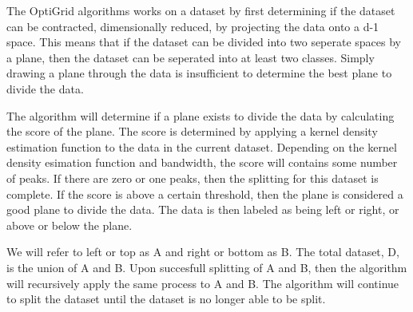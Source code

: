 The OptiGrid algorithms works on a dataset by first determining if the dataset can be contracted, dimensionally reduced, by projecting the data onto a d-1 space. 
This means that if the dataset can be divided into two seperate spaces by a plane, then the dataset can be seperated into at least two classes. Simply drawing a plane through the data is insufficient to determine the best plane to divide the data.\par

The algorithm will determine if a plane exists to divide the data by calculating the score of the plane. 
The score is determined by applying a kernel density estimation function to the data in the current dataset.
Depending on the kernel density esimation function and bandwidth, the score will contains some number of peaks.
If there are zero or one peaks, then the splitting for this dataset is complete. If the score is above a certain threshold, then the plane is considered a good plane to divide the data.
The data is then labeled as being left or right, or above or below the plane.\par
We will refer to left or top as A and right or bottom as B. 
The total dataset, D, is the union of A and B. Upon succesfull splitting of A and B, then the algorithm will recursively apply the same process to A and B.
The algorithm will continue to split the dataset until the dataset is no longer able to be split. 
